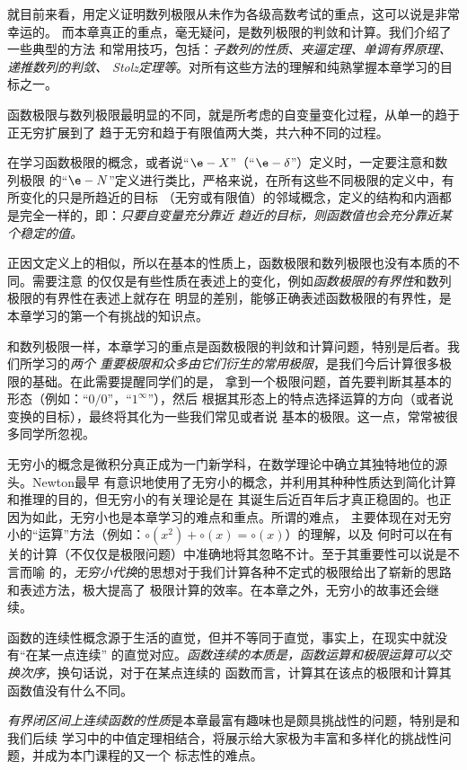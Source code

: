 就目前来看，用定义证明数列极限从未作为各级高数考试的重点，这可以说是非常幸运的。
而本章真正的重点，毫无疑问，是数列极限的判敛和计算。我们介绍了一些典型的方法
和常用技巧，包括：{\it 子数列的性质、夹逼定理、单调有界原理、递推数列的判敛、
Stolz定理等}。对所有这些方法的理解和纯熟掌握本章学习的目标之一。

函数极限与数列极限最明显的不同，就是所考虑的自变量变化过程，从单一的趋于正无穷扩展到了
趋于无穷和趋于有限值两大类，共六种不同的过程。

在学习函数极限的概念，或者说“$\e-X$”（“$\e-\delta$”）定义时，一定要注意和数列极限
的“$\e-N$”定义进行类比，严格来说，在所有这些不同极限的定义中，有所变化的只是所趋近的目标
（无穷或有限值）的邻域概念，定义的结构和内涵都是完全一样的，即：{\it 只要自变量充分靠近
趋近的目标，则函数值也会充分靠近某个稳定的值。}

正因文定义上的相似，所以在基本的性质上，函数极限和数列极限也没有本质的不同。需要注意
的仅仅是有些性质在表述上的变化，例如{\it 函数极限的有界性}和数列极限的有界性在表述上就存在
明显的差别，能够正确表述函数极限的有界性，是本章学习的第一个有挑战的知识点。

和数列极限一样，本章学习的重点是函数极限的判敛和计算问题，特别是后者。我们所学习的{\it 两个
重要极限和众多由它们衍生的常用极限}，是我们今后计算很多极限的基础。在此需要提醒同学们的是，
拿到一个极限问题，首先要判断其基本的形态（例如：“$0/0$”，“$1^{\infty}$”），然后
根据其形态上的特点选择运算的方向（或者说变换的目标），最终将其化为一些我们常见或者说
基本的极限。这一点，常常被很多同学所忽视。

无穷小的概念是微积分真正成为一门新学科，在数学理论中确立其独特地位的源头。Newton最早
有意识地使用了无穷小的概念，并利用其种种性质达到简化计算和推理的目的，但无穷小的有关理论是在
其诞生后近百年后才真正稳固的。也正因为如此，无穷小也是本章学习的难点和重点。所谓的难点，
主要体现在对无穷小的“运算”方法（例如：$\circ(x^2)+\circ(x)=\circ(x)$）的理解，以及
何时可以在有关的计算（不仅仅是极限问题）中准确地将其忽略不计。至于其重要性可以说是不言而喻
的，{\it 无穷小代换}的思想对于我们计算各种不定式的极限给出了崭新的思路和表述方法，极大提高了
极限计算的效率。在本章之外，无穷小的故事还会继续。

函数的连续性概念源于生活的直觉，但并不等同于直觉，事实上，在现实中就没有“在某一点连续”
的直觉对应。{\it 函数连续的本质是，函数运算和极限运算可以交换次序}，换句话说，对于在某点连续的
函数而言，计算其在该点的极限和计算其函数值没有什么不同。

{\it 有界闭区间上连续函数的性质}是本章最富有趣味也是颇具挑战性的问题，特别是和我们后续
学习中的中值定理相结合，将展示给大家极为丰富和多样化的挑战性问题，并成为本门课程的又一个
标志性的难点。

